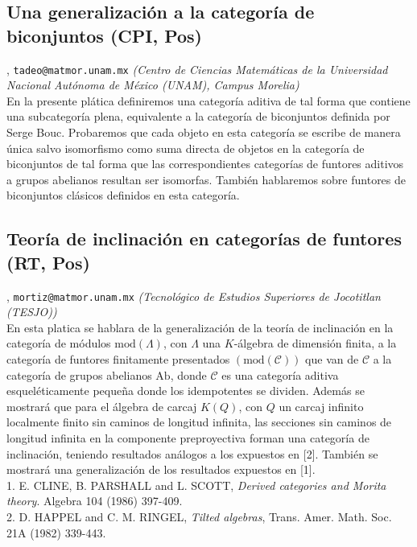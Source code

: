 \subsection{\sffamily Una generalizaci\'on a la categor\'ia de biconjuntos {\footnotesize (CPI, Pos)}} \label{reg-510} 
, {\tt tadeo@matmor.unam.mx}  {\slshape (Centro de Ciencias Matem\'aticas de la Universidad Nacional Aut\'onoma de M\'exico (UNAM), Campus Morelia)}\\
          \noindent En la presente pl\'atica definiremos una categor\'ia  aditiva de tal forma que contiene una subcategor\'ia plena, equivalente a la categor\'ia de biconjuntos definida por Serge Bouc. Probaremos que cada objeto en esta categor\'ia se escribe de manera \'unica salvo isomorfismo como suma directa de objetos en la categor\'ia de biconjuntos de tal forma que las correspondientes categor\'ias de funtores aditivos a grupos abelianos resultan ser isomorfas. Tambi\'en hablaremos sobre funtores de biconjuntos cl\'asicos definidos en esta categor\'ia.
\subsection{\sffamily Teor\'ia de inclinaci\'on en categor\'ias de funtores {\footnotesize (RT, Pos)}} \label{reg-1684} 
, {\tt mortiz@matmor.unam.mx}  {\slshape (Tecnol\'ogico de Estudios Superiores de Jocotitlan (TESJO))}\\
          \noindent En esta platica se hablara de la generalizaci\'on de la teor\'ia de inclinaci\'on en la categor\'ia de m\'odulos  $\mathrm{mod}(\Lambda)$, con $\Lambda$ una $K$-\'algebra de dimensi\'on finita, a la categor\'ia de funtores finitamente  presentados $(\mathrm{mod}(\mathcal{C}))$  que van de $\mathcal{C}$ a  la categor\'ia de grupos abelianos $\mathrm{Ab}$,  donde $\mathcal{C}$ es una categor\'ia aditiva esquel\'eticamente peque\~na donde los idempotentes se dividen.    Adem\'as se mostrar\'a que para  el \'algebra de carcaj $K(Q)$, con $Q$ un carcaj infinito localmente finito sin caminos de longitud infinita,  las secciones sin caminos de longitud infinita en la componente preproyectiva  forman una categor\'ia de inclinaci\'on, teniendo resultados an\'alogos a los expuestos en [2]. Tambi\'en se mostrar\'a una generalizaci\'on de los resultados expuestos en [1].\\ 1. E. CLINE, B. PARSHALL and L. SCOTT, \emph{Derived categories and Morita theory}. Algebra 104 (1986) 397-409.\\ 2. D. HAPPEL and C. M. RINGEL, \emph{Tilted algebras}, Trans. Amer. Math. Soc. 21A (1982) 339-443.
